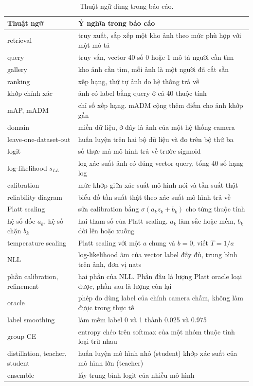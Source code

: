 \documentclass[11pt,a4paper]{article}
\begin{document}
\begin{table}[H]
\centering\small
\begin{tabularx}{\linewidth}{@{}lX@{}}
\toprule
Thuật ngữ & Ý nghĩa trong báo cáo \\
\midrule
retrieval & truy xuất, sắp xếp một kho ảnh theo mức phù hợp với một mô tả \\
query & truy vấn, vector 40 số 0 hoặc 1 mô tả người cần tìm \\
gallery & kho ảnh cần tìm, mỗi ảnh là một người đã cắt sẵn \\
ranking & xếp hạng, thứ tự ảnh do hệ thống trả về \\
khớp chính xác & ảnh có label bằng query ở cả 40 thuộc tính \\
mAP, mADM & chỉ số xếp hạng. mADM cộng thêm điểm cho ảnh khớp gần \\
domain & miền dữ liệu, ở đây là ảnh của một hệ thống camera \\
leave-one-dataset-out & huấn luyện trên hai bộ dữ liệu và đo trên bộ thứ ba \\
logit & số thực mà mô hình trả về trước sigmoid \\
log-likelihood $s_{LL}$ & log xác suất ảnh có đúng vector query, tổng 40 số hạng log \\
calibration & mức khớp giữa xác suất mô hình nói và tần suất thật \\
reliability diagram & biểu đồ tần suất thật theo xác suất mô hình trả về \\
Platt scaling & sửa calibration bằng $\sigma(a_kz_k+b_k)$ cho từng thuộc tính \\
hệ số dốc $a_k$, hệ số chặn $b_k$ & hai tham số của Platt scaling. $a_k$ làm sắc hoặc mềm, $b_k$ dời lên hoặc xuống \\
temperature scaling & Platt scaling với một $a$ chung và $b=0$, viết $T=1/a$ \\
NLL & log-likelihood âm của vector label đầy đủ, trung bình trên ảnh, đơn vị nats \\
phần calibration, refinement & hai phần của NLL. Phần đầu là lượng Platt oracle loại được, phần sau là lượng còn lại \\
oracle & phép đo dùng label của chính camera chấm, không làm được trong thực tế \\
label smoothing & làm mềm label 0 và 1 thành 0.025 và 0.975 \\
group CE & entropy chéo trên softmax của một nhóm thuộc tính loại trừ nhau \\
distillation, teacher, student & huấn luyện mô hình nhỏ (student) khớp xác suất của mô hình lớn (teacher) \\
ensemble & lấy trung bình logit của nhiều mô hình \\
\bottomrule
\end{tabularx}
\caption{Thuật ngữ dùng trong báo cáo.}
\end{table}
\end{document}
